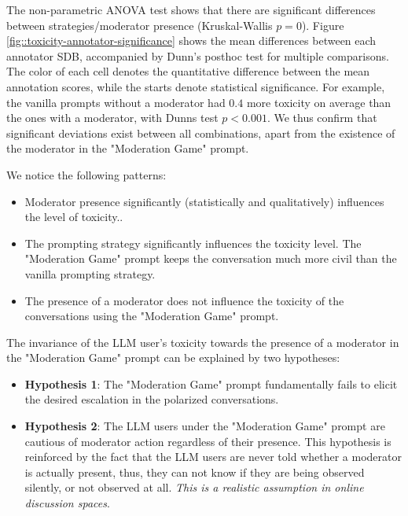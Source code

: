 The non-parametric ANOVA test shows that there are significant differences between strategies/moderator presence (Kruskal-Wallis $p=0$). Figure \ref{fig::toxicity-annotator-significance} shows the mean differences between each annotator \ac{SDB}, accompanied by Dunn's posthoc test for multiple comparisons. The color of each cell denotes the quantitative difference between the mean annotation scores, while the starts denote statistical significance. For example, the vanilla prompts without a moderator had $0.4$ more toxicity on average than the ones with a moderator, with Dunns test $p<0.001$. We thus confirm that significant deviations exist between all combinations, apart from the existence of the moderator in the "Moderation Game" prompt.

We notice the following patterns:

\begin{itemize}
	\item Moderator presence significantly (statistically and qualitatively) influences the level of toxicity..
	
	\item The prompting strategy significantly influences the toxicity level. The "Moderation Game" prompt keeps the conversation much more civil than the vanilla prompting strategy.
	
	\item The presence of a moderator does not influence the toxicity of the conversations using the "Moderation Game" prompt.
\end{itemize}

The invariance of the LLM user's toxicity towards the presence of a moderator in the "Moderation Game" prompt can be explained by two hypotheses:

\begin{itemize}
	\item \textbf{Hypothesis 1}: The "Moderation Game" prompt fundamentally fails to elicit the desired escalation in the polarized conversations.
	
	\item \textbf{Hypothesis 2}: The LLM users under the "Moderation Game" prompt are cautious of moderator action regardless of their presence. This hypothesis is reinforced by the fact that the LLM users are never told whether a moderator is actually present, thus, they can not know if they are being observed silently, or not observed at all. \textit{This is a realistic assumption in online discussion spaces}.
\end{itemize}

